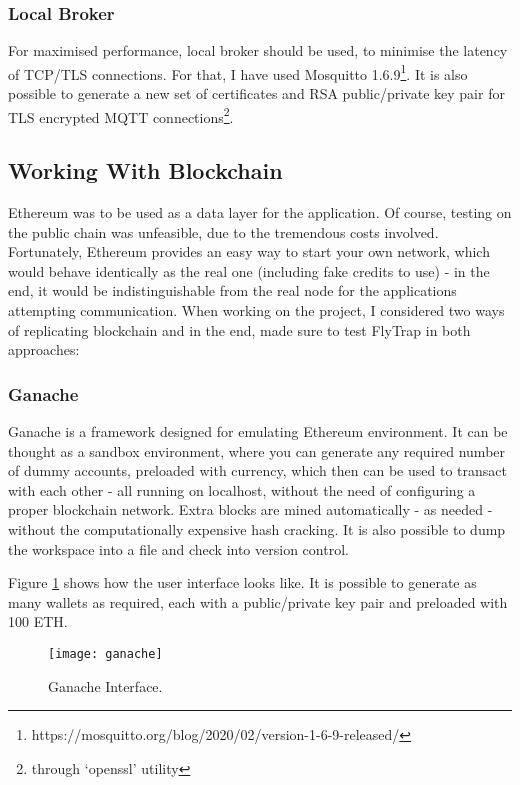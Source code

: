 \subsubsection{Local Broker}
For maximised performance, local broker should be used, to minimise the latency of TCP/TLS connections. For that, I have used Mosquitto 1.6.9\footnote{https://mosquitto.org/blog/2020/02/version-1-6-9-released/}. It is also possible to generate a new set of certificates and RSA public/private key pair for TLS encrypted MQTT connections\footnote{through `openssl' utility}.  
\subsection{Working With Blockchain}
Ethereum was to be used as a data layer for the application. Of course, testing on the public chain was unfeasible, due to the tremendous costs involved. Fortunately, Ethereum provides an easy way to start your own network, which would behave identically as the real one (including fake credits to use) - in the end, it would be indistinguishable from the real node for the applications attempting communication. When working on the project, I considered two ways of replicating blockchain and in the end, made sure to test FlyTrap in both approaches:
\subsubsection{Ganache}
Ganache\cite{lee2019testing} is a framework designed for emulating Ethereum environment. It can be thought as a sandbox environment, where you can generate any required number of dummy accounts, preloaded with currency, which then can be used to transact with each other - all running on localhost, without the need of configuring a proper blockchain network. Extra blocks are mined automatically - as needed - without the computationally expensive hash cracking. It is also possible to dump the workspace into a file and check into version control.

Figure \ref{fig:ganache} shows how the user interface looks like. It is possible to generate as many wallets as required, each with a public/private key pair and preloaded with 100 ETH.
\begin{figure}[h]
    \centering
    \texttt{[image: ganache]}
    \caption{Ganache Interface.}
    \label{fig:ganache}
\end{figure}

